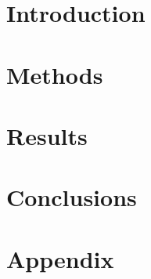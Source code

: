 \documentclass[14pt, oneside]{extreport}
\begin{document}
    
    \nocite{*}
    
    \newpage
    
    \pagestyle{empty}
    
    \tableofcontents
    \pagestyle{fancy}

    \chapter{Introduction}
    
    \chapter{Methods}
    
    \chapter{Results}
    
    \chapter{Conclusions}
    
    \chapter*{Appendix}
    
    
    \printbibliography
\end{document}
